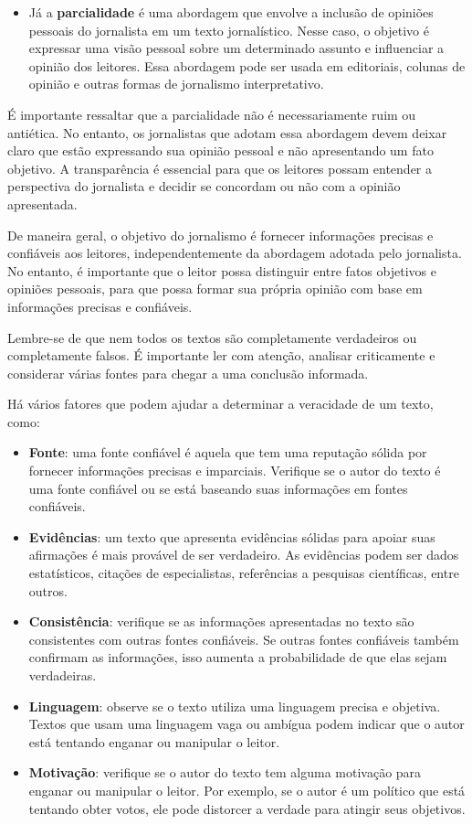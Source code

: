 {\begin{itemize}
\item Já a \textbf{parcialidade} é uma abordagem que envolve a inclusão de opiniões
pessoais do jornalista em um texto jornalístico. Nesse caso, o objetivo
é expressar uma visão pessoal sobre um determinado assunto e influenciar
a opinião dos leitores. Essa abordagem pode ser usada em editoriais,
colunas de opinião e outras formas de jornalismo interpretativo.
\end{itemize}

É importante ressaltar que a parcialidade não é necessariamente ruim ou
antiética. No entanto, os jornalistas que adotam essa abordagem devem
deixar claro que estão expressando sua opinião pessoal e não
apresentando um fato objetivo. A transparência é essencial para que os
leitores possam entender a perspectiva do jornalista e decidir se
concordam ou não com a opinião apresentada.

De maneira geral, o objetivo do jornalismo é fornecer informações
precisas e confiáveis aos leitores, independentemente da abordagem
adotada pelo jornalista. No entanto, é importante que o leitor possa
distinguir entre fatos objetivos e opiniões pessoais, para que possa
formar sua própria opinião com base em informações precisas e
confiáveis.

Lembre-se de que nem todos os textos são completamente verdadeiros ou
completamente falsos. É importante ler com atenção, analisar
criticamente e considerar várias fontes para chegar a uma conclusão
informada.

Há vários fatores que podem ajudar a determinar a veracidade de um
texto, como:

\begin{itemize}
\item \textbf{Fonte}: uma fonte confiável é aquela que tem uma reputação
sólida por fornecer informações precisas e imparciais. Verifique se o
autor do texto é uma fonte confiável ou se está baseando suas
informações em fontes confiáveis.
\item \textbf{Evidências}: um texto que apresenta evidências sólidas para apoiar suas
afirmações é mais provável de ser verdadeiro. As evidências podem ser
dados estatísticos, citações de especialistas, referências a pesquisas
científicas, entre outros.
\item \textbf{Consistência}: verifique se as informações apresentadas no texto são
consistentes com outras fontes confiáveis. Se outras fontes confiáveis
também confirmam as informações, isso aumenta a probabilidade de que
elas sejam verdadeiras.
\item \textbf{Linguagem}: observe se o texto utiliza uma linguagem precisa e objetiva.
Textos que usam uma linguagem vaga ou ambígua podem indicar que o autor
está tentando enganar ou manipular o leitor.
\item \textbf{Motivação}: verifique se o autor do texto tem alguma motivação para
enganar ou manipular o leitor. Por exemplo, se o autor é um político que
está tentando obter votos, ele pode distorcer a verdade para atingir
seus objetivos.
\end{itemize}
}

